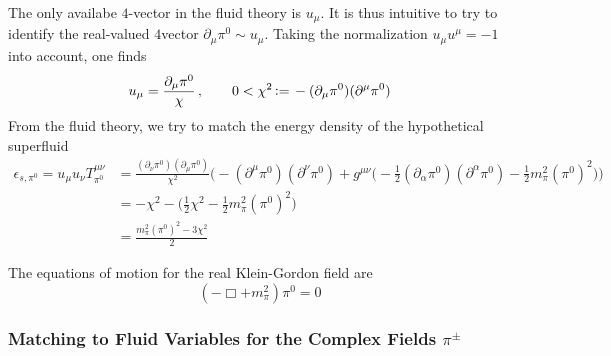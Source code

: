 The only availabe $4$-vector in the fluid theory is $u_\mu$. It is thus intuitive to try to identify the real-valued $4$vector $\partial_\mu\pi^0\sim u_\mu$. Taking the normalization $u_\mu u^\mu=-1$ into account, one finds
\begin{equation}
    u_\mu=\frac{\partial_\mu\pi^0}{\chi}\,,\qquad0<\chi^2{\,\vcentcolon=\,}-(\partial_\mu\pi^0)(\partial^\mu\pi^0)
\end{equation}
From the fluid theory, we try to match the energy density of the hypothetical superfluid
\begin{subequations}
    \begin{align}
        \epsilon_{s,\pi^0}=u_\mu u_\nu T^{\mu\nu}_{\pi^0}&=\frac{(\partial_\nu\pi^0)(\partial_\mu\pi^0)}{\chi^2}\Big(-(\partial^\mu\pi^0)(\partial^\nu\pi^0)+g^{\mu\nu}\big(-\frac{1}{2}(\partial_\alpha\pi^0)(\partial^\alpha\pi^0)-\frac{1}{2}m_\pi^2(\pi^0)^2\big)\Big)\\
        &=-\chi^2-\big(\frac{1}{2}\chi^2-\frac{1}{2}m_\pi^2(\pi^0)^2\big)\\
        &=\frac{m_\pi^2(\pi^0)^2-3\chi^2}{2}
    \end{align}
\end{subequations}

The equations of motion for the real Klein-Gordon field are
\begin{equation}
    (-\Box+m_\pi^2)\pi^0=0
\end{equation}


\subsubsection{Matching to Fluid Variables for the Complex Fields $\pi^\pm$}

